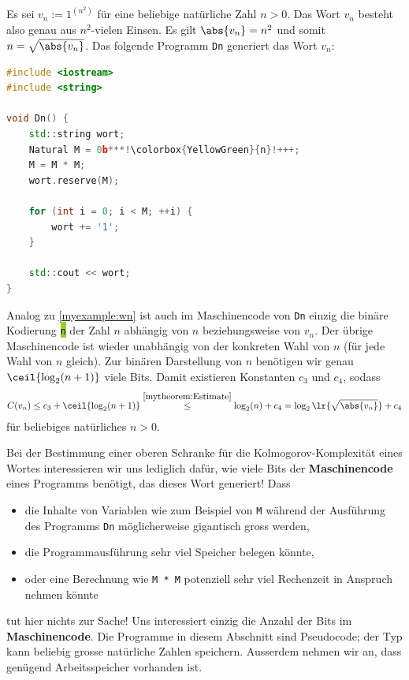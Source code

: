 \begin{myexample}\label{myexample:vn}
Es sei $v_n := 1^{(n^2)}$ für eine beliebige natürliche Zahl $n > 0$. Das Wort $v_n$ besteht also genau aus $n^2$-vielen Einsen. Es gilt $\abs{v_n} = n^2$ und somit $n = \sqrt{\abs{v_n}}$. Das folgende Programm \texttt{Dn} generiert das Wort $v_n$:
\begin{lstlisting}[language=C++,escapechar=!] 
#include <iostream>
#include <string>

void Dn() {
    std::string wort;
    Natural M = 0b***!\colorbox{YellowGreen}{n}!+++;
    M = M * M;
    wort.reserve(M);

    for (int i = 0; i < M; ++i) {
        wort += '1';
    }

    std::cout << wort;
}
    \end{lstlisting}
Analog zu \cref{myexample:wn} ist auch im Maschinencode von \texttt{Dn} einzig die binäre Kodierung \colorbox{YellowGreen}{\texttt{n}} der Zahl $n$ abhängig von $n$ beziehungsweise von $v_n$. Der übrige Maschinencode ist wieder unabhängig von der konkreten Wahl von $n$ (für jede Wahl von $n$ gleich). Zur binären Darstellung von $n$ benötigen wir genau $\ceil{\log_2(n+1)}$ viele Bits. Damit existieren Konstanten $c_3$ und $c_4$, sodass
\begin{align*}
	C(v_n) \leq c_3 + \ceil{\log_2(n+1)} \stackrel{\cref{mytheorem:Estimate}}{\leq} \log_2(n) + c_4 = \log_2\lr{\sqrt{\abs{v_n}}} + c_4
\end{align*}
für beliebiges natürliches $n>0$.

Bei der Bestimmung einer oberen Schranke für die Kolmogorov-Komplexität eines Wortes interessieren wir uns lediglich dafür, wie viele Bits der \textbf{Maschinencode} eines Programms benötigt, das dieses Wort generiert!
Dass
\begin{itemize}
	\item die Inhalte von Variablen wie zum Beispiel von \texttt{M} während der Ausführung des Programms \texttt{Dn} möglicherweise gigantisch gross werden,
	\item die Programmausführung sehr viel Speicher belegen könnte,
	\item oder eine Berechnung wie \texttt{M * M} potenziell sehr viel Rechenzeit in Anspruch nehmen könnte
\end{itemize}
tut hier nichts zur Sache! Uns interessiert einzig die Anzahl der Bits im \textbf{Maschinencode}. Die Programme in diesem Abschnitt sind Pseudocode; der Typ  kann beliebig grosse natürliche Zahlen speichern. Ausserdem nehmen wir an, dass genügend Arbeitsspeicher vorhanden ist.
\end{myexample}

